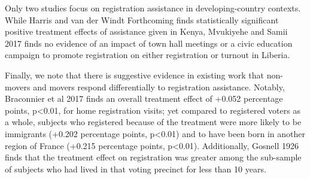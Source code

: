 \documentclass[
  11.5pt,
]{article}
\begin{document}
Only two studies focus on registration assistance in developing-country
contexts. While Harris and van der Windt Forthcoming finds statistically
significant positive treatment effects of assistance given in Kenya,
Mvukiyehe and Samii 2017 finds no evidence of an impact of town hall
meetings or a civic education campaign to promote registration on either
registration or turnout in Liberia.

Finally, we note that there is suggestive evidence in existing work that
non-movers and movers respond differentially to registration assistance.
Notably, Braconnier et al 2017 finds an overall treatment effect of
+0.052 percentage points, p\textless0.01, for home registration visits;
yet compared to registered voters as a whole, subjects who registered
because of the treatment were more likely to be immigrants (+0.202
percentage points, p\textless0.01) and to have been born in another
region of France (+0.215 percentage points, p\textless0.01).
Additionally, Gosnell 1926 finds that the treatment effect on
registration was greater among the sub-sample of subjects who had lived
in that voting precinct for less than 10 years.
\end{document}
